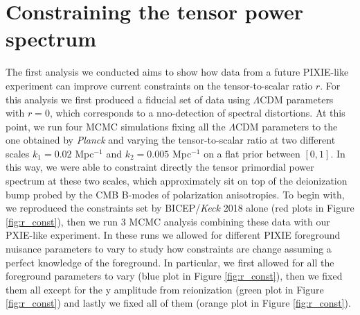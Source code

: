 \section{Constraining the tensor power spectrum}
The first analysis we conducted aims to show how data from a future PIXIE-like experiment can improve current constraints on the tensor-to-scalar ratio $r$. For this analysis we first produced a fiducial set of data using $\Lambda$CDM parameters with $r=0$, which corresponds to a nno-detection of spectral distortions. At this point, we run four MCMC simulations fixing all the $\Lambda$CDM parameters to the one obtained by \emph{Planck}\cite{planck2018results} and varying the tensor-to-scalar ratio at two different scales $k_1=0.02$ Mpc$^{-1}$ and $k_2=0.005$ Mpc$^{-1}$ on a flat prior between $[0,1]$. In this way, we were able to constraint directly the tensor primordial power spectrum at these two scales, which approximately sit on top of the deionization bump probed by the CMB B-modes of polarization anisotropies. To begin with, we reproduced the constraints set by BICEP/\textit{Keck} 2018 alone (red plots in Figure \ref{fig:r_const}), then we run 3 MCMC analysis combining these data with our PXIE-like experiment. In these runs we allowed for different PIXIE foreground nuisance parameters to vary to study how constraints are change assuming a perfect knowledge of the foreground. In particular, we first allowed for all the foreground parameters to vary (blue plot in Figure \ref{fig:r_const}), then we fixed them all except for the y amplitude from reionization (green plot in Figure \ref{fig:r_const}) and lastly we fixed all of them (orange plot in Figure \ref{fig:r_const}). 
